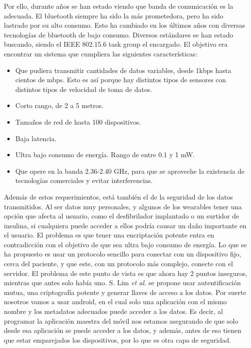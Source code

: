 \documentclass[12pt]{article}
\numberwithin{equation}{section}
\begin{document}
Por ello, durante años se han estado viendo que banda de comunicación es la adecuada. El bluetooth siempre ha sido la más prometedora, pero ha sido lastrado por su alto consumo. Esto ha cambiado en los últimos años con diversas tecnologías de bluetooth de bajo consumo. Diversos estándares se han estado buscando, siendo el IEEE 802.15.6 task group el encargado. El objetivo era encontrar un sistema que cumpliera las siguientes características:
\begin{itemize}
\item Que pudiera transmitir cantidades de datos variables, desde 1kbps hasta cientos de mbps. Esto es así porque hay distintos tipos de sensores con distintos tipos de velocidad de toma de datos.
\item Corto rango, de 2 a 5 metros.
\item Tamaños de red de hasta 100 dispositivos.
\item Baja latencia.
\item Ultra bajo consumo de energía. Rango de entre 0.1 y 1 mW.
\item Que opere en la banda 2.36-2.40 GHz, para que se aproveche la existencia de tecnologías comerciales y evitar interferencias.
\end{itemize}

Además de estos requerimientos, está también el de la seguridad de los datos transmitidos. Al ser datos muy personales, y algunos de los wearables tener una opción que afecta al usuario, como el desfibrilador implantado o un surtidor de insulina, si cualquiera puede acceder a ellos podría causar un daño importante en el usuario. El problema es que tener una encriptación potente entra en contradicción con el objetivo de que sea ultra bajo consumo de energía. Lo que se ha propuesto es usar un protocolo sencillo para conectar con un dispositivo fijo, cerca del paciente, y que este, con un protocolo más complejo, conecte con el servidor. El problema de este punto de vista es que ahora hay 2 puntos inseguros, mientras que antes solo había uno. S. Lim \textit{et al\cite{5504649}.} se propone usar autentificación mutua, una criptografía potente y generar llaves de acceso a los datos. Por suerte nosotros vamos a usar android, en el cual solo una aplicación con el mismo nombre y los metadatos adecuados puede acceder a los datos. Es decir, al programar la aplicación maestra del móvil nos estamos asegurando de que solo desde esa aplicación se puede acceder a los datos, y además, antes de eso tienen que estar emparejados los dispositivos, por lo que es otra capa de seguridad.
\end{document}
